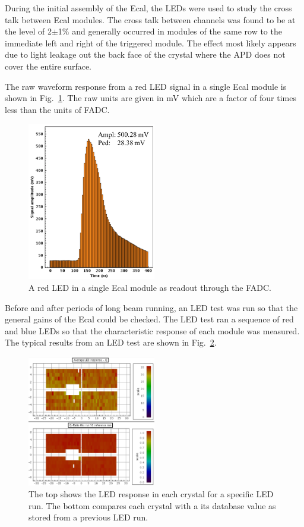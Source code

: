 \documentclass[12pt]{report}
\begin{document}
During the initial assembly of the Ecal, the LEDs were used to study the cross talk between Ecal modules. The cross talk between channels was found to be at the level of 2$\pm$1$\%$ and generally occurred in modules of the same row to the immediate left and right of the triggered module. The effect most likely appears due to light leakage out the back face of the crystal where the APD does not cover the entire surface.

The raw waveform response from a red LED signal in a single Ecal module is shown in Fig.~\ref{Figure:redSignal}. The raw units are given in mV which are a factor of four times less than the units of FADC.

\begin{figure}[H]
  \centering
      \includegraphics[width=0.5\textwidth]{pics/experiment/ledSignal.png}
  \caption[LED signal in Ecal FADC]{A red LED in a single Ecal module as readout through the FADC.}
  \label{Figure:redSignal}
\end{figure}

Before and after periods of long beam running, an LED test was run so that the general gains of the Ecal could be checked. The LED test ran a sequence of red and blue LEDs so that the characteristic response of each module was measured. The typical results from an LED test are shown in Fig.~\ref{Figure:redCompare}.

\begin{figure}[H]
  \centering
      \includegraphics[width=0.5\textwidth]{pics/experiment/ledCompare.png}
  \caption[Results of a single LED run]{The top shows the LED response in each crystal for a specific LED run. The bottom compares each crystal with a its database value as stored from a previous LED run.}
  \label{Figure:redCompare}
\end{figure}
\end{document}
